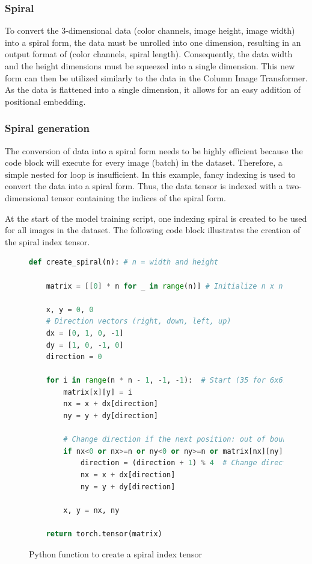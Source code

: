     \subsubsection{Spiral}

    To convert the 3-dimensional data (color channels, image height, image width) into a spiral form, the data must be unrolled into one dimension, resulting in an output format of (color channels, spiral length). Consequently, the data width and the height dimensions must be squeezed into a single dimension. This new form can then be utilized similarly to the data in the Column Image Transformer. As the data is flattened into a single dimension, it allows for an easy addition of positional embedding.

    \subsubsection{Spiral generation}

    The conversion of data into a spiral form needs to be highly efficient because the code block will execute for every image (batch) in the dataset. Therefore, a simple nested for loop is insufficient. In this example, fancy indexing is used to convert the data into a spiral form. Thus, the data tensor is indexed with a two-dimensional tensor containing the indices of the spiral form.

    At the start of the model training script, one indexing spiral is created to be used for all images in the dataset. The following code block illustrates the creation of the spiral index tensor.

\begin{figure}[H]
\centering
\begin{lstlisting}[language=Python]
def create_spiral(n): # n = width and height
    
    matrix = [[0] * n for _ in range(n)] # Initialize n x n matrix

    x, y = 0, 0
    # Direction vectors (right, down, left, up)
    dx = [0, 1, 0, -1]
    dy = [1, 0, -1, 0]
    direction = 0

    for i in range(n * n - 1, -1, -1):  # Start (35 for 6x6)
        matrix[x][y] = i
        nx = x + dx[direction]
        ny = y + dy[direction]

        # Change direction if the next position: out of bounds or filled
        if nx<0 or nx>=n or ny<0 or ny>=n or matrix[nx][ny]!=0:
            direction = (direction + 1) % 4  # Change direction
            nx = x + dx[direction]
            ny = y + dy[direction]

        x, y = nx, ny
    
    return torch.tensor(matrix)
\end{lstlisting}
\caption{Python function to create a spiral index tensor}
\label{fig:spiral_matrix}
\end{figure}


